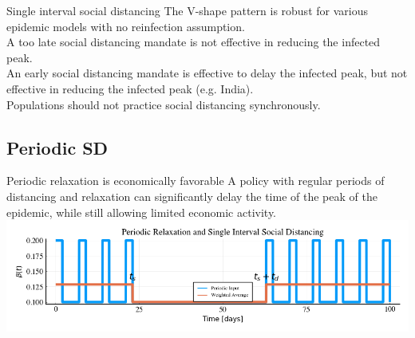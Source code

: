 \documentclass[10pt]{beamer}
\begin{document}
\begin{frame}{Single interval social distancing}
	The V-shape pattern is robust for various epidemic models with no reinfection assumption. \\ \vspace{0.5cm}
	A too late social distancing mandate is not effective in reducing the infected peak. \\ \vspace{0.5cm}
	An early social distancing mandate is effective to delay the infected peak, but not effective in reducing the infected peak (e.g. India). \\ \vspace{0.5cm}
	Populations should not practice social distancing synchronously.
\end{frame}

\subsection{Periodic SD}
\begin{frame}{Periodic relaxation is economically favorable}
	 A policy with regular periods of distancing and relaxation can significantly delay the time of the peak of the epidemic, while still allowing limited economic activity. \\ \vspace{1cm}
	\includegraphics[width=1\textwidth]{epidemic-combination.png}
\end{frame}
\end{document}
